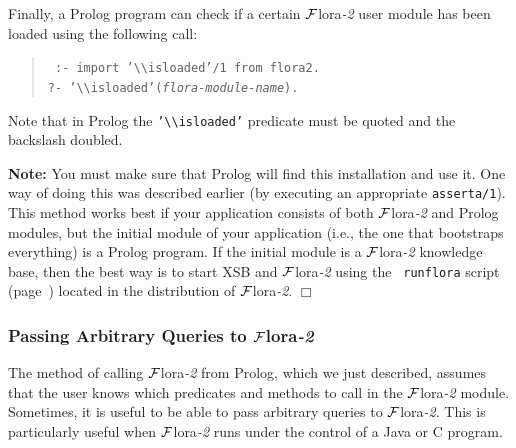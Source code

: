 \documentclass[11pt]{article}
\newcommand{\FLORA}{{\mbox{\sc ${\cal F}${lora}\rm\emph{-2}}}\xspace}
\newcommand{\FLSYSTEM}{\FLORA}
\newcommand{\ENGINERUN}{runflora}
\newcommand{\bs}{\textbackslash}
\begin{document}
Finally, a Prolog program can check if a certain \FLSYSTEM user module has been
loaded using the following call:
\index{\bs{}isloaded/1 predicate}
\begin{quote}
 \tt
 :- import '\bs{}\bs{}isloaded'/1 from flora2.\\
 ?- '\bs{}\bs{}isloaded'({\it flora-module-name}).
\end{quote}
Note that in Prolog the {\tt '\bs{}\bs{}isloaded'} predicate
must be quoted and the backslash doubled.

\noindent
{\bf Note:} 
You must make sure that Prolog will find this installation and use it.
One way of doing this was described
earlier (by executing an appropriate {\tt asserta/1}). This method works
best if your application consists of both \FLSYSTEM and Prolog modules, but
the initial module of your application (i.e., the one that bootstraps
everything) is a Prolog program.  If the initial module is a \FLSYSTEM
knowledge base, then the best way is to start XSB and \FLSYSTEM using the {\tt
  \ENGINERUN} script (page~\pageref{runflora-page}) located in the
distribution of \FLSYSTEM.
\hfill $\Box$

\subsubsection{Passing Arbitrary Queries to \FLSYSTEM}

The method of calling \FLSYSTEM from Prolog, which we just described, assumes
that the user knows which predicates and methods to call in the \FLSYSTEM
module. Sometimes, it is useful to be able to pass arbitrary queries to
\FLSYSTEM. This is particularly useful when \FLSYSTEM runs under the control of a
Java or C program.
\end{document}
